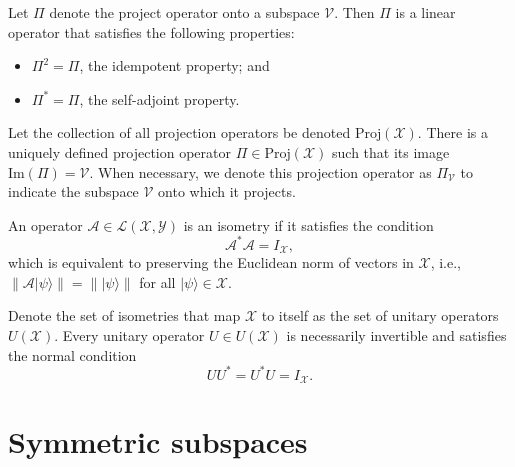 \begin{remark}\label{remark:ProjectionOperators}
    Let $\Pi$ denote the project operator onto a subspace $\mathcal{V}$.
    Then $\Pi$ is a linear operator that satisfies the following properties:
    \begin{itemize}
        \item $\Pi^2 = \Pi$, the idempotent property; and
        \item $\Pi^* = \Pi$, the self-adjoint property.
    \end{itemize}
    Let the collection of all projection operators be denoted $\text{Proj}(\mathcal{X})$.
    There is a uniquely defined projection operator $\Pi \in \text{Proj}(\mathcal{X})$ such that its image $\text{Im}(\Pi) = \mathcal{V}$.
    When necessary, we denote this projection operator as $\Pi_{\mathcal{V}}$ to indicate the subspace $\mathcal{V}$ onto which it projects.
\end{remark}

\begin{remark}[Isometries]\label{remark:isometries}
    An operator $\mathcal{A} \in \mathcal{L}(\mathcal{X}, \mathcal{Y})$ is an isometry if it satisfies the condition
    \begin{equation}
        \mathcal{A}^{*} \mathcal{A} = I_{\mathcal{X}},
    \end{equation}
    which is equivalent to preserving the Euclidean norm of vectors in $\mathcal{X}$, i.e., $\|\mathcal{A}|\psi\rangle\| = \||\psi\rangle\|$ for all $|\psi\rangle \in \mathcal{X}$.
\end{remark}


\begin{remark}\label{remark:UnitaryOperators}
    Denote the set of isometries that map $\mathcal{X}$ to itself as the set of unitary operators $U(\mathcal{X})$.
    Every unitary operator $U \in U(\mathcal{X})$ is necessarily invertible and satisfies the normal condition
    \begin{equation}
        UU^{*} = U^{*}U = I_{\mathcal{X}}.
    \end{equation}
\end{remark}


\section{Symmetric subspaces}


